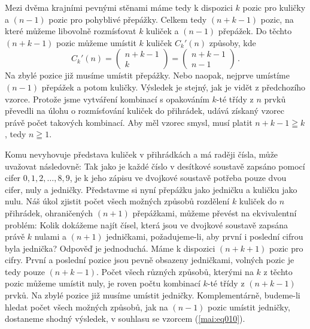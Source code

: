 \begin{example}
  Mezi dvěma krajními pevnými stěnami máme tedy k dispozici \(k\) pozic pro kuličky a \((n - 1)\) 
  pozic pro pohyblivé přepážky. Celkem tedy \((n + k - 1)\) pozic, na které můžeme libovolně 
  rozmísťovat \(k\) kuliček a \((n - 1)\) přepážek. Do těchto \((n + k - 1)\) pozic můžeme umístit 
  \(k\) kuliček \(C_k'(n)\) způsoby, kde
  \begin{equation}\label{MAI:eq011}
  \boxed{C_k'(n) =  
    \begin{pmatrix}
        n + k - 1 \\
        k
    \end{pmatrix} = 
    \begin{pmatrix}
        n + k - 1 \\
        n-1
    \end{pmatrix}
    }\, .
  \end{equation}
  Na zbylé pozice již musíme umístit přepážky. Nebo naopak, nejprve umístíme \((n - 1)\) přepážek a 
  potom kuličky. Výsledek je stejný, jak je vidět z předchozího vzorce. Protože jsme vytváření 
  kombinací s opakováním \(k\)-té třídy z \(n\) prvků převedli na úlohu o rozmísťování kuliček do 
  přihrádek, udává získaný vzorec právě počet takových kombinací. Aby měl vzorec smysl, musí platit 
  \(n + k - 1 \geqq k\), tedy \(n \geqq 1\).

  Komu nevyhovuje představa kuliček v přihrádkách a má raději čísla, může uvažovat následovně: Tak 
  jako je každé číslo v desítkové soustavě zapsáno pomocí cifer \(0, 1, 2, \ldots , 8, 9\), je k 
  jeho zápisu ve dvojkové soustavě potřeba pouze dvou cifer, nuly a jedničky. Představme si nyní 
  přepážku jako jedničku a kuličku jako nulu. Náš úkol zjistit počet všech možných způsobů 
  rozdělení \(k\) kuliček do \(n\) přihrádek, ohraničených \((n+1)\) přepážkami, můžeme převést na 
  ekvivalentní problém: Kolik dokážeme najít čísel, která jsou ve dvojkové soustavě zapsána právě 
  \(k\) nulami a \((n + 1)\) jedničkami, požadujeme-li, aby první i poslední cifrou byla jednička? 
  Odpověď je jednoduchá. Máme k dispozici \((n+k+1)\) pozic pro cifry. První a poslední pozice jsou 
  pevně obsazeny jedničkami, volných pozic je tedy pouze \((n + k - 1)\). Počet všech různých 
  způsobů, kterými na \(k\) z těchto pozic můžeme umístit nuly, je roven počtu kombinací \(k\)-té 
  třídy z \((n + k - 1)\) prvků. Na zbylé pozice již musíme umístit jedničky. Komplementárně, 
  budeme-li hledat počet všech možných způsobů, jak na \((n-1)\) pozic umístit jedničky, dostaneme 
  shodný výsledek, v souhlasu se vzorcem (\ref{mai:eq010}).
\normalsize
\end{example}